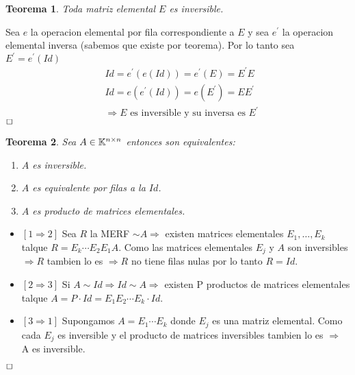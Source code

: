 \documentclass[]{article}
\newtheorem{theorem}{Teorema}
\newenvironment{proof}{\noindent{\bf Prueba:}}{$\hfill \Box$ \vspace{10pt}}
\begin{document}
\begin{theorem}
    Toda matriz elemental $E$ es inversible.
\end{theorem}
\begin{proof}
    Sea $e$ la operacion elemental por fila correspondiente a $E$ y sea $e^{\prime}$ la operacion elemental inversa
    (sabemos que existe por teorema). Por lo tanto sea $E^{\prime}=e^{\prime}(Id)$
    \begin{align*}
        &Id=e^{\prime}(e(Id))=e^{\prime}(E)=E^{\prime}E\\
        &Id=e(e^{\prime}(Id))=e(E^{\prime})=EE^{\prime}\\
        &\Longrightarrow E \text{ es inversible y su inversa es } E^{\prime}
    \end{align*}
\end{proof}
\begin{theorem}
    Sea $A \in\text{$\mathbb{K}^{n \times n}$}$ entonces son equivalentes:
    \begin{enumerate}
        \item $A$ es inversible.
        \item $A$ es equivalente por filas a la $Id$.
        \item $A$ es producto de matrices elementales.
    \end{enumerate}
\end{theorem}
\begin{proof}
    \begin{itemize}
        \item $[1 \Longrightarrow 2]$ Sea $R$ la MERF $\sim A \Longrightarrow$ existen matrices elementales
        $E_1, \dots ,E_k$ talque $R=E_k\cdots E_2E_1A$. Como las matrices elementales $E_j$ y $A$ son inversibles
        $\Longrightarrow R$ tambien lo es $\Longrightarrow R$ no tiene filas nulas por lo tanto $R=Id$.
        \item $[2 \Longrightarrow 3]$ Si $A \sim Id \Longrightarrow Id \sim A \Longrightarrow$ existen P productos
        de matrices elementales talque $A = P \cdot Id = E_1E_2 \cdots E_k \cdot Id$.
        \item $[3 \Longrightarrow 1]$ Supongamos $A=E_1 \cdots E_k$ donde $E_j$ es una matriz elemental. Como cada
        $E_j$ es inversible y el producto de matrices inversibles tambien lo es $\Longrightarrow$ A es inversible.
    \end{itemize}
\end{proof}
\end{document}
